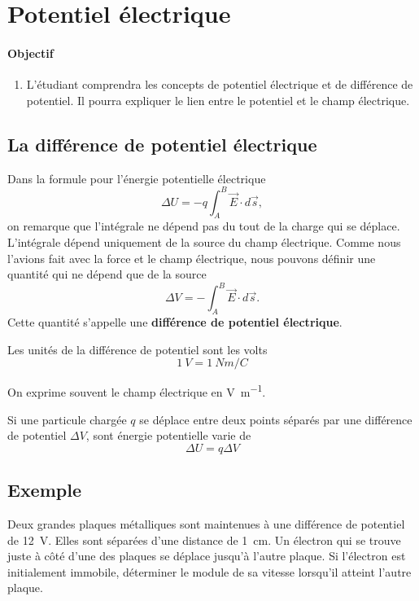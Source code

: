 \sectionline


\section{Potentiel électrique}


\paragraph{Objectif}

\begin{enumerate}
  \item L'étudiant comprendra les concepts de potentiel électrique et de
    différence de potentiel. Il pourra expliquer le lien entre le potentiel et
    le champ électrique.
\end{enumerate}



\subsection*{La différence de potentiel électrique}


Dans la formule pour l'énergie potentielle électrique
\[
  \Delta U = -q \int_A^B \vec{E}\cdot d\vec{s},
\]
on remarque que l'intégrale ne dépend pas du tout de la charge qui se déplace.
L'intégrale dépend uniquement de la source du champ électrique. Comme nous
l'avions fait avec la force et le champ électrique, nous pouvons définir une
quantité qui ne dépend que de la source
\[
  \Delta V = - \int_A^B \vec{E}\cdot d\vec{s}.
\]
Cette quantité s'appelle une \textbf{différence de potentiel électrique}.

Les unités de la différence de potentiel sont les volts
$$\SI{1}{V} = \SI{1}{Nm/C}$$

On exprime souvent le champ électrique en \si{\volt\per\meter}.

Si une particule chargée $q$ se déplace entre deux points séparés par une
différence de potentiel $\Delta V$, sont énergie potentielle varie de
\[
  \Delta U = q \Delta V
\]


\subsection*{Exemple}

Deux grandes plaques métalliques sont maintenues à une différence de potentiel
de \SI{12}{V}. Elles sont séparées d'une distance de \SI{1}{cm}. Un électron
qui se trouve juste à côté d'une des plaques se déplace jusqu'à l'autre plaque.
Si l'électron est initialement immobile, déterminer le module de sa vitesse
lorsqu'il atteint l'autre plaque.

